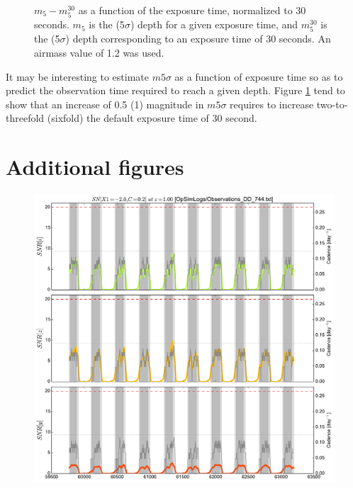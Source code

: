 \documentclass[\docopts]{\docclass}
\begin{document}
\begin{figure}[t]
\begin{center}
\caption{$m_{5}-m_{5}^{30}$ as a function of the exposure time,
  normalized to 30 seconds. $m_{5}$ is the (5$\sigma$) depth for a given
  exposure time, and $m_{5}^{30}$ is the (5$\sigma$) depth
  corresponding to an exposure time of 30 seconds. An airmass value of
1.2 was used.}
\label{fig:m5_expoTime}
\end{center}
\end{figure}

It may be interesting to estimate $m5\sigma$ as a function
of exposure time so as to predict the observation time required to
reach a given depth. Figure \ref{fig:m5_expoTime} tend to show that an
increase of 0.5 (1) magnitude in $m5\sigma$ requires to increase
two-to-threefold (sixfold)  the default exposure time of 30 second.

\section{Additional figures}

\begin{figure}[t]
  \begin{center}
    \includegraphics[width=\linewidth]{metric_DD_744.pdf}
    \caption{}
  \end{center}
\end{figure}
\end{document}
